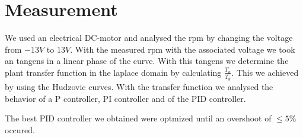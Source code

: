 \section{Measurement}

We  used an electrical DC-motor and analysed the rpm by changing  the  voltage
from $-13V$ to $13V$. With the measured rpm  with  the  associated  voltage we
took an tangens in a linear phase of the curve. With this tangens we determine
the  plant  transfer  function   in   the   laplace   domain   by  calculating
$\frac{T_{u}}{T_{g}}$. This we achieved by using the Hudzovic curves. With the
transfer function we analysed  the  behavior  of a P controller, PI controller
and of the PID controller.

The best PID controller we obtained were optmized until  an overshoot of $\leq
5 \%$ occured.
